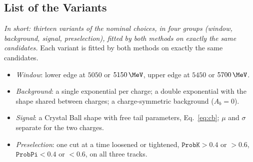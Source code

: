 \begin{table}[t]
\caption{All fits of the nominal model and of its variants: number of candidates, Bayesian posterior median and 68\% credible interval of $\Araw$, binned goodness of fit ($10\,\MeV$ bins), and frequentist estimate with its Hesse uncertainty (Sec.~\ref{sec:frequentist}; fitted on the same candidates; the cross-checks of the Bayesian fits that have no frequentist counterpart in this work are marked --). $^\dagger$ Uncertainty scaled from the number of events, since the Hesse matrix of that fit is not accurate. Every fit uses 32 walkers and $25{,}000$ steps.}
\label{tab:bayes_all}
\end{table}


\subsection{List of the Variants}
\emph{In short: thirteen variants of the nominal choices, in four groups (window, background, signal, preselection), fitted by both methods on exactly the same candidates.}
Each variant is fitted by both methods on exactly the same candidates.
\begin{itemize}[leftmargin=*,itemsep=1pt]
\item \emph{Window}: lower edge at $5050$ or $5150\,\MeV$, upper edge at $5450$ or $5700\,\MeV$.
\item \emph{Background}: a single exponential per charge; a double exponential with the shape shared between charges; a charge-symmetric background ($A_b=0$).
\item \emph{Signal}: a Crystal Ball shape with free tail parameters, Eq.~\eqref{eq:cb}; $\mu$ and $\sigma$ separate for the two charges.
\item \emph{Preselection}: one cut at a time loosened or tightened, $\texttt{ProbK}>0.4$ or $>0.6$, $\texttt{ProbPi}<0.4$ or $<0.6$, on all three tracks.
\end{itemize}

